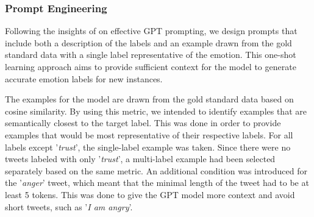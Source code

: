 \documentclass[manuscript]{clv3}
\begin{document}
\subsubsection{Prompt Engineering} \label{prompt}
Following the insights of \citet{yoo2021gpt3mix} on effective GPT prompting, we design prompts that include both a description of the labels and an example drawn from the gold standard data with a single label representative of the emotion. This one-shot learning approach aims to provide sufficient context for the model to generate accurate emotion labels for new instances. 

The examples for the model are drawn from the gold standard data based on cosine similarity. By using this metric, we intended to identify examples that are semantically closest to the target label. This was done in order to provide examples that would be most representative of their respective labels. For all labels except '\textit{trust}', the single-label example was taken. Since there were no tweets labeled with only '\textit{trust}', a multi-label example had been selected separately based on the same metric. An additional condition was introduced for the '\textit{anger}' tweet, which meant that the minimal length of the tweet had to be at least 5 tokens. This was done to give the GPT model more context and avoid short tweets, such as '\textit{I am angry}'.
\end{document}
